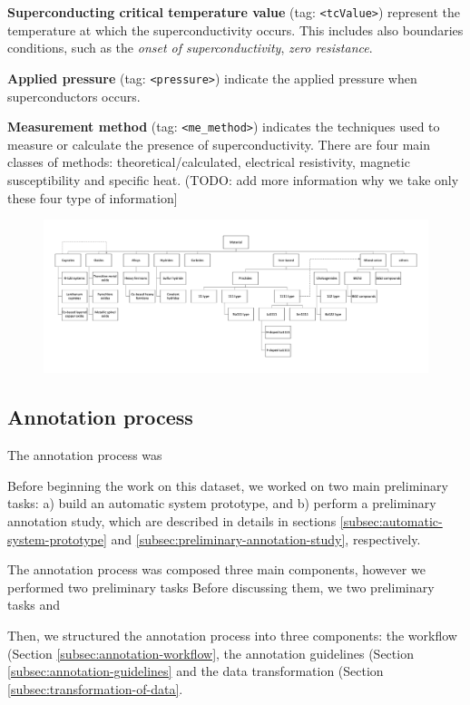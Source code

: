 \documentclass[a4paper,10pt]{article}
\begin{document}
\textbf{Superconducting critical temperature value} (tag: \texttt{<tcValue>}) represent the temperature at which the superconductivity occurs. This includes also boundaries conditions, such as the \textit{onset of superconductivity}, \textit{zero resistance}. 

\textbf{Applied pressure} (tag: \texttt{<pressure>}) indicate the applied pressure when superconductors occurs. 

\textbf{Measurement method} (tag: \texttt{<me\_method>}) indicates the techniques used to measure or calculate the presence of superconductivity. There are four main classes of methods: theoretical/calculated, electrical resistivity, magnetic susceptibility and specific heat. 
(TODO: add more information why we take only these four type of information]

\begin{figure}[h]
    \centering
    \includegraphics[scale=0.4, angle=90]{classes-superconductors-hierarchy}
    \label{fig:class-hierachy}
\end{figure}

\subsection{Annotation process}
\label{sec:annotation-process}
The annotation process was 

Before beginning the work on this dataset, we worked on two main preliminary tasks: a) build an automatic system prototype, and b) perform a preliminary annotation study, which are described in details in sections \ref{subsec:automatic-system-prototype} and \ref{subsec:preliminary-annotation-study}, respectively.

The annotation process was  composed three main components, however we performed two preliminary tasks Before discussing them, we  two preliminary tasks and 

Then, we structured the annotation process into three components: the workflow (Section \ref{subsec:annotation-workflow}, the annotation guidelines (Section \ref{subsec:annotation-guidelines} and the data transformation (Section \ref{subsec:transformation-of-data}. 
\end{document}
